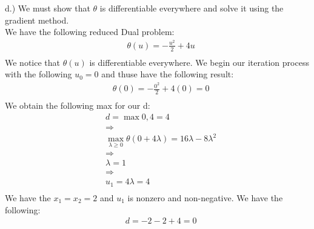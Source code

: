 \documentclass[12pt]{article}
\begin{document}
    d.) We must show that $\theta$ is differentiable everywhere and solve it using the gradient method.\\
    We have the following reduced Dual problem:\\
        \begin{align*}
            &\theta(u) = -\frac{u^2}{2} + 4u\\
        \end{align*}
    We notice that $\theta(u)$ is differentiable everywhere. We begin our iteration process with the following $u_0 = 0$ and thuse have the following result: \\
        \begin{align*}
            &\theta(0) = -\frac{0^2}{2} + 4(0) = 0\\
        \end{align*}
    We obtain the following max for our d:\\
        \begin{align*}
            &d = \max{0,4} = 4\\
            &\Rightarrow\\
            &\max_{\lambda \geq 0} \theta(0+4\lambda) = 16\lambda -8\lambda^2\\
            &\Rightarrow\\
            &\lambda = 1\\
            &\Rightarrow\\
            &u_1=4\lambda = 4\\
        \end{align*}
    We have the $x_1 = x_2 = 2$ and $u_1 $ is nonzero and non-negative. We have the following:\\
        \begin{align*}
            &d=-2-2+4 = 0 
        \end{align*}
\end{document}
